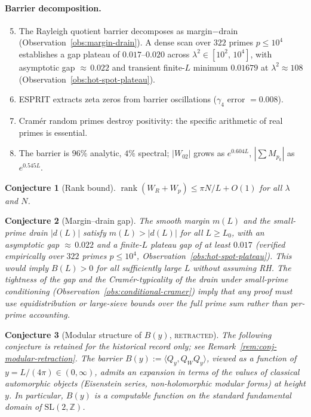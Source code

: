 \documentclass[11pt,a4paper]{article}
\newtheorem{conjecture}{Conjecture}[section]
\begin{document}
\paragraph{Barrier decomposition.}
\begin{enumerate}
\setcounter{enumi}{4}
\item The Rayleigh quotient barrier decomposes as margin$-$drain (Observation~\ref{obs:margin-drain}). A dense scan over $322$ primes $p \le 10^4$ establishes a gap plateau of $0.017\text{--}0.020$ across $\lambda^2 \in [10^2,\, 10^4]$, with asymptotic gap ${\approx}\,0.022$ and transient finite-$L$ minimum $0.01679$ at $\lambda^2 \approx 108$ (Observation~\ref{obs:hot-spot-plateau}).
\item ESPRIT extracts zeta zeros from barrier oscillations ($\gamma_4$ error $= 0.008$).
\item Cram\'er random primes destroy positivity: the specific arithmetic of real primes is essential.
\item The barrier is $96\%$ analytic, $4\%$ spectral; $|W_{02}|$ grows as $e^{0.604L}$, $|\sum M_{p_k}|$ as $e^{0.545L}$.
\end{enumerate}

\begin{conjecture}[Rank bound]\label{conj:rank}
$\operatorname{rank}(W_R + W_p) \leq \pi N/L + O(1)$ for all $\lambda$ and $N$.
\end{conjecture}

\begin{conjecture}[Margin--drain gap]\label{conj:gap}
The smooth margin $m(L)$ and the small-prime drain $|d(L)|$ satisfy $m(L) > |d(L)|$ for all $L \ge L_0$, with an asymptotic gap ${\approx}\,0.022$ and a finite-$L$ plateau gap of at least $0.017$ (verified empirically over $322$ primes $p \le 10^4$, Observation~\ref{obs:hot-spot-plateau}). This would imply $B(L) > 0$ for all sufficiently large $L$ without assuming RH. The tightness of the gap and the Cram\'er-typicality of the drain under small-prime conditioning (Observation~\ref{obs:conditional-cramer}) imply that any proof must use equidistribution or large-sieve bounds over the full prime sum rather than per-prime accounting.
\end{conjecture}

\begin{conjecture}[Modular structure of $B(y)$, \textsc{retracted}]\label{conj:modular}
\emph{The following conjecture is retained for the historical record only; see Remark~\ref{rem:conj-modular-retraction}.} The barrier $B(y) := \langle Q_y, Q_W Q_y\rangle$, viewed as a function of $y = L/(4\pi) \in (0, \infty)$, admits an expansion in terms of the values of classical automorphic objects (Eisenstein series, non-holomorphic modular forms) at height $y$. In particular, $B(y)$ is a computable function on the standard fundamental domain of $\mathrm{SL}(2,\mathbb{Z})$.
\end{conjecture}
\end{document}
